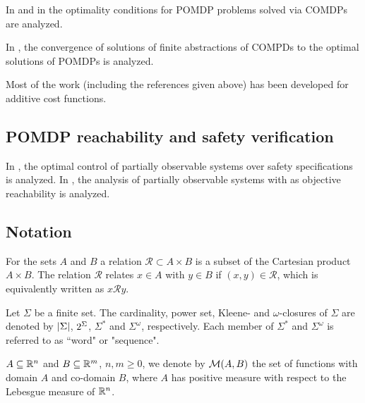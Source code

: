 \documentclass[conference]{IEEEtran}
\newcommand{\rel}{\mathcal{R}}%
\begin{document}
In \cite{feinberg2016partially} and in \cite{feinberg2014optimality} the optimality conditions for POMDP problems solved via COMDPs are analyzed. 

In \cite{saldi2017finite}, the convergence of solutions of finite abstractions of COMPDs to the optimal solutions of POMDPs is analyzed. 


Most of the work (including the references given above) has been developed for additive cost functions. 


\subsection{POMDP reachability and safety verification}

In \cite{ding2013optimal}, the optimal control of partially observable systems over safety specifications is analyzed. 
In \cite{LESSER20141989}, the analysis of partially observable systems with as objective reachability is analyzed. 


\subsection{Notation}

For the sets $A$ and $B$ a relation $\rel\subset A\times B$ is a subset of the Cartesian product $A\times B$. The relation $\rel$ relates $x\in A$ with $y\in B$ if $(x,y)\in\rel$, which is equivalently written as $x\rel y$.




    Let $\Sigma$ be a finite set. The cardinality,
    power set, Kleene- and $\omega$-closures
    of $\Sigma$ are denoted by $\left| {\Sigma} \right|$,
    $2^{\Sigma}$, $\Sigma^*$ and $\Sigma^\omega$,
    respectively.    
    Each member of $\Sigma^*$ and $\Sigma^\omega$ is referred to as ``word" or "sequence". 
    
    
    $A \subseteq \mathbb{R}^n$ and $B \subseteq \mathbb{R}^m$,
    $n, m \geq 0$, we denote by $\mathcal{M}(A, B)$ the set of
    functions with domain $A$ and co-domain $B$, where $A$ has positive measure with
    respect to the Lebesgue measure of $\mathbb{R}^n$.
    
\end{document}
